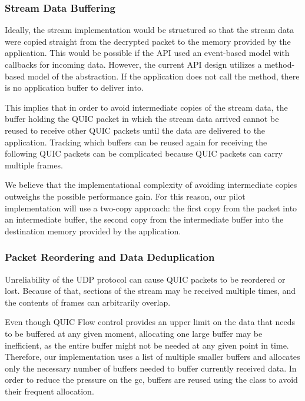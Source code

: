 \subsubsection{Stream Data Buffering}

Ideally, the stream implementation would be structured so that the stream data were copied straight
from the decrypted packet to the memory provided by the application. This would be possible if the
API used an event-based model with callbacks for incoming data. However, the current API design
utilizes a method-based model of the \Stream{} abstraction. If the application does not call the
 method, there is no application buffer to deliver into.

This implies that in order to avoid intermediate copies of the stream data, the buffer holding the
QUIC packet in which the stream data arrived cannot be reused to receive other QUIC packets until
the data are delivered to the application. Tracking which buffers can be reused again for receiving
the following QUIC packets can be complicated because QUIC packets can carry multiple \STREAM{}
frames.

We believe that the implementational complexity of avoiding intermediate copies outweighs the
possible performance gain. For this reason, our pilot implementation will use a two-copy approach:
the first copy from the packet into an intermediate buffer, the second copy from the intermediate
buffer into the destination memory provided by the application.

\subsubsection{Packet Reordering and Data Deduplication}

Unreliability of the UDP protocol can cause QUIC packets to be reordered or lost. Because of that,
sections of the stream may be received multiple times, and the contents of \STREAM{} frames can
arbitrarily overlap.

Even though QUIC Flow control provides an upper limit on the data that needs to be buffered at any
given moment, allocating one large buffer may be inefficient, as the entire buffer might not be
needed at any given point in time. Therefore, our implementation uses a list of multiple smaller
buffers and allocates only the necessary number of buffers needed to buffer currently received data.
In order to reduce the pressure on the \gls{gc}, buffers are reused using the \ArrayPoolOf{\Byte{}}
class to avoid their frequent allocation.

